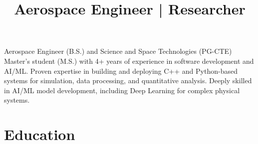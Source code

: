 \documentclass[11pt,a4paper,sans]{moderncv}
\title{Aerospace Engineer | Researcher} %
\begin{document}
\makecvtitle

\small{Aerospace Engineer (B.S.) and Science and Space Technologies (PG-CTE) Master's student (M.S.) with 4+ years of experience in software development and AI/ML. Proven expertise in building and deploying C++ and Python-based systems for simulation, data processing, and quantitative analysis. Deeply skilled in AI/ML model development, including Deep Learning for complex physical systems.}
\vspace{10pt}

\section{Education}

\end{document}
